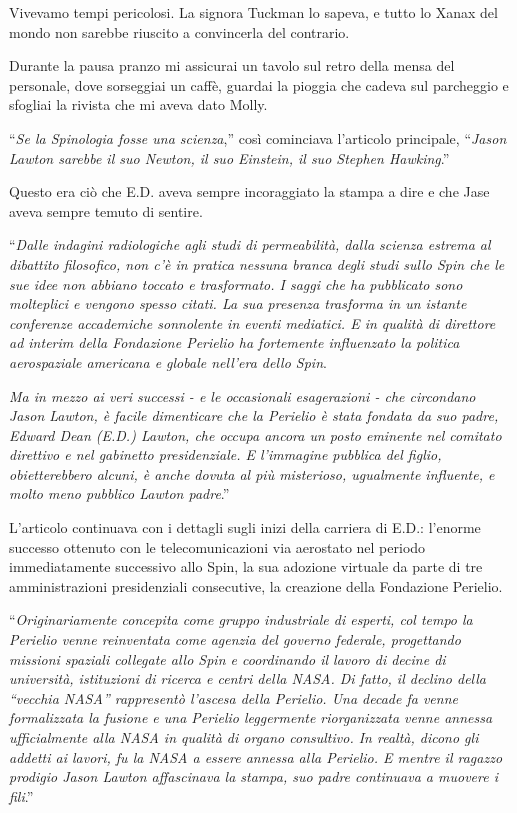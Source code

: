 Vivevamo tempi pericolosi. La signora Tuckman lo sapeva, e tutto lo
Xanax del mondo non sarebbe riuscito a convincerla del contrario.

\separatorefiori

Durante la pausa pranzo mi assicurai un tavolo sul retro della mensa del
personale, dove sorseggiai un caffè, guardai la pioggia che cadeva sul
parcheggio e sfogliai la rivista che mi aveva dato Molly.

``\emph{Se la Spinologia fosse una scienza},'' così cominciava
l'articolo principale, ``\emph{Jason Lawton sarebbe il suo Newton, il
	suo Einstein, il suo Stephen Hawking}.''

Questo era ciò che E.D. aveva sempre incoraggiato la stampa a dire e che
Jase aveva sempre temuto di sentire.

``\emph{Dalle indagini radiologiche agli studi di permeabilità, dalla
	scienza estrema al dibattito filosofico, non c'è in pratica nessuna
	branca degli studi sullo Spin che le sue idee non abbiano toccato e
	trasformato. I saggi che ha pubblicato sono molteplici e vengono spesso
	citati. La sua presenza trasforma in un istante conferenze accademiche
	sonnolente in eventi mediatici. E in qualità di direttore ad interim
	della Fondazione Perielio ha fortemente influenzato la politica
	aerospaziale americana e globale nell'era dello Spin}.

\emph{Ma in mezzo ai veri successi - e le occasionali esagerazioni - che
	circondano Jason Lawton, è facile dimenticare che la Perielio è stata
	fondata da suo padre, Edward Dean (E.D.) Lawton, che occupa ancora un
	posto eminente nel comitato direttivo e nel gabinetto presidenziale. E
	l'immagine pubblica del figlio, obietterebbero alcuni, è anche dovuta al
	più misterioso, ugualmente influente, e molto meno pubblico Lawton
	padre}.''

L'articolo continuava con i dettagli sugli inizi della carriera di E.D.:
l'enorme successo ottenuto con le telecomunicazioni via aerostato nel
periodo immediatamente successivo allo Spin, la sua adozione virtuale da
parte di tre amministrazioni presidenziali consecutive, la creazione
della Fondazione Perielio.

``\emph{Originariamente concepita come gruppo industriale di esperti,
	col tempo la Perielio venne reinventata come agenzia del governo
	federale, progettando missioni spaziali collegate allo Spin e
	coordinando il lavoro di decine di università, istituzioni di ricerca e
	centri della NASA. Di fatto, il declino della ``vecchia NASA''
	rappresentò l'ascesa della Perielio. Una decade fa venne formalizzata la
	fusione e una Perielio leggermente riorganizzata venne annessa
	ufficialmente alla NASA in qualità di organo consultivo. In realtà,
	dicono gli addetti ai lavori, fu la NASA a essere annessa alla Perielio.
	E mentre il ragazzo prodigio Jason Lawton affascinava la stampa, suo
	padre continuava a muovere i fili}.''

